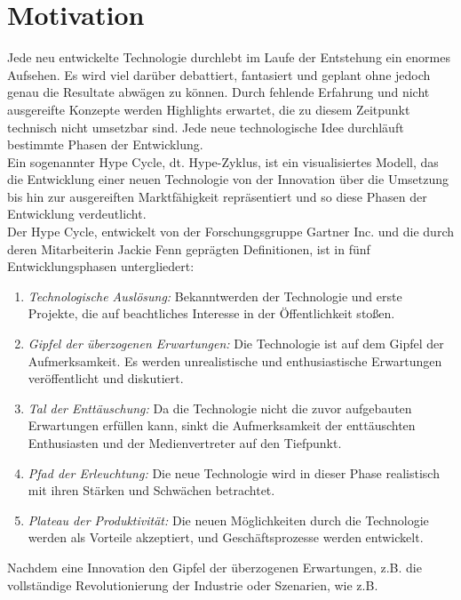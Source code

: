 \section{Motivation}
\label{chap:Motivation}
Jede neu entwickelte Technologie durchlebt im Laufe der Entstehung ein enormes Aufsehen. Es wird viel darüber debattiert, fantasiert 
und geplant ohne jedoch genau die Resultate abwägen zu können. Durch fehlende Erfahrung und nicht ausgereifte Konzepte werden Highlights 
erwartet, die zu diesem Zeitpunkt technisch nicht umsetzbar sind. Jede neue technologische Idee durchläuft bestimmte Phasen der Entwicklung.
\cite{studiob12.2020j} 
\\ 
\linebreak
Ein sogenannter Hype Cycle, dt. Hype-Zyklus, ist ein visualisiertes Modell, das die Entwicklung einer neuen Technologie von der 
Innovation über die Umsetzung bis hin zur ausgereiften Marktfähigkeit repräsentiert und so diese Phasen der Entwicklung verdeutlicht.
\\
Der Hype Cycle, entwickelt von der Forschungsgruppe Gartner Inc. und die durch deren Mitarbeiterin Jackie Fenn geprägten Definitionen, ist 
in fünf Entwicklungsphasen untergliedert:
\begin{enumerate}
    \item \textit{Technologische Auslösung:} Bekanntwerden der Technologie und erste Projekte, die auf beachtliches Interesse in der 
    Öffentlichkeit stoßen. 
    \item \textit{Gipfel der überzogenen Erwartungen:} Die Technologie ist auf dem Gipfel der Aufmerksamkeit. Es werden unrealistische 
    und enthusiastische Erwartungen veröffentlicht und diskutiert.
    \item \textit{Tal der Enttäuschung:} Da die Technologie nicht die zuvor aufgebauten Erwartungen erfüllen kann, sinkt die Aufmerksamkeit 
    der enttäuschten Enthusiasten und der Medienvertreter auf den Tiefpunkt.
    \item \textit{Pfad der Erleuchtung:} Die neue Technologie wird in dieser Phase realistisch mit ihren Stärken und Schwächen betrachtet.
    \item \textit{Plateau der Produktivität:} Die neuen Möglichkeiten durch die Technologie werden als Vorteile akzeptiert, und 
    Geschäftsprozesse werden entwickelt. \cite{gartnerhc.2016s}
\end{enumerate} 
Nachdem eine Innovation den Gipfel der überzogenen Erwartungen, z.B. die vollständige Revolutionierung der Industrie oder Szenarien, wie z.B. 
